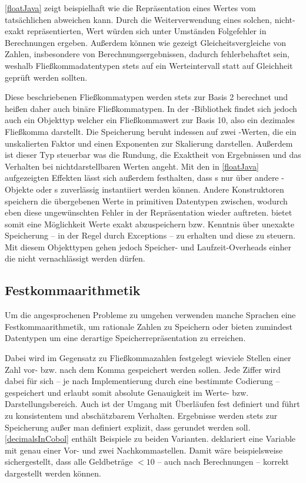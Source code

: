 \autoref{floatJava} zeigt beispielhaft wie die Repräsentation eines Wertes vom tatsächlichen abweichen kann. Durch die Weiterverwendung eines solchen, nicht-exakt repräsentierten, Wert würden sich unter Umständen Folgefehler in Berechnungen ergeben. Außerdem können wie gezeigt Gleicheitsvergleiche von Zahlen, insbesondere von Berechnungsergebnissen, dadurch fehlerbehaftet sein, weshalb Fließkommadatentypen stets auf ein Werteintervall statt auf Gleichheit geprüft werden sollten.

Diese beschriebenen Fließkommatypen werden stets zur Basis 2 berechnet und heißen daher auch binäre Fließkommatypen. In der -Bibliothek findet sich jedoch auch ein Objekttyp  welcher ein Fließkommawert zur Basis 10, also ein dezimales Fließkomma darstellt. Die Speicherung beruht in­des­sen auf zwei -Werten, die ein unskalierten Faktor und einen Exponenten zur Skalierung darstellen. Außerdem ist dieser Typ steuerbar was die Rundung, die Exaktheit von Ergebnissen und das Verhalten bei nichtdarstellbaren Werten angeht. Mit den in \autoref{floatJava} aufgezeigten Effekten lässt sich außerdem festhalten, dass s nur über andere -Objekte oder s zuverlässig instantiiert werden können. Andere Konstruktoren speichern die übergebenen Werte in primitiven Datentypen zwischen, wodurch eben diese ungewünschten Fehler in der Repräsentation wieder auftreten.  bietet somit eine Möglichkeit Werte exakt abzuspeichern bzw. Kenntnis über unexakte Speicherung -- in der Regel durch Exceptions -- zu erhalten und diese zu steuern. Mit diesem Objekttypen gehen jedoch Speicher- und Laufzeit-Overheads einher die nicht vernachlässigt werden dürfen.

\subsection*{Festkommaarithmetik}
Um die angesprochenen Probleme zu umgehen verwenden manche Sprachen eine Festkommaarithmetik, um rationale Zahlen zu Speichern oder bieten zumindest Datentypen um eine derartige Speicherrepräsentation zu erreichen. 

Dabei wird im Gegensatz zu Fließkommazahlen festgelegt wieviele Stellen einer Zahl vor- bzw. nach dem Komma gespeichert werden sollen. Jede Ziffer wird dabei für sich -- je nach Implementierung durch eine bestimmte Codierung -- gespeichert und erlaubt somit absolute Genauigkeit im Werte- bzw. Darstellungsbereich. Auch ist der Umgang mit Überläufen fest definiert und führt zu konsistentem und abschätzbarem Verhalten. Ergebnisse werden stets zur Speicherung  außer man definiert explizit, dass gerundet werden soll. \autoref{decimalsInCobol} enthält Beispiele zu beiden Varianten.  deklariert eine Variable mit genau einer Vor- und zwei Nachkommastellen. Damit wäre beispielsweise sichergestellt, dass alle Geldbeträge $< 10$ -- auch nach Berechnungen -- korrekt dargestellt werden können.

